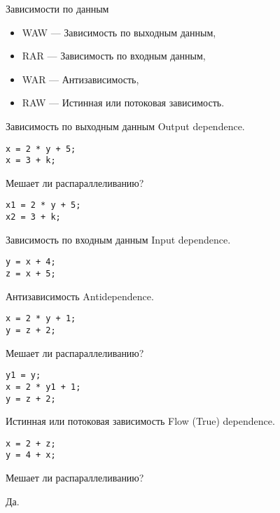 \begin{frame}{Зависимости по данным}
\begin{itemize}
  \item WAW --- Зависимость по выходным данным,
  \item RAR --- Зависимость по входным данным,
  \item WAR --- Антизависимость,
  \item RAW --- Истинная или потоковая зависимость.
\end{itemize}
\end{frame}

\begin{frame}[fragile]{Зависимость по выходным данным}
Output dependence.

\pause\bigskip

\begin{lstlisting}
x = 2 * y + 5;
x = 3 + k;
\end{lstlisting}

Мешает ли распараллеливанию?

\pause\bigskip

\begin{lstlisting}
x1 = 2 * y + 5;
x2 = 3 + k;
\end{lstlisting}
\end{frame}

\begin{frame}[fragile]{Зависимость по входным данным}
Input dependence.

\pause\bigskip

\begin{lstlisting}
y = x + 4;
z = x + 5;
\end{lstlisting}
\end{frame}

\begin{frame}[fragile]{Антизависимость}
Antidependence.

\pause\bigskip

\begin{lstlisting}
x = 2 * y + 1;
y = z + 2;
\end{lstlisting}

Мешает ли распараллеливанию?

\pause

\begin{lstlisting}
y1 = y;
x = 2 * y1 + 1;
y = z + 2;
\end{lstlisting}
\end{frame}

\begin{frame}[fragile]{Истинная или потоковая зависимость}
Flow (True) dependence.

\pause\bigskip

\begin{lstlisting}
x = 2 + z;
y = 4 + x;
\end{lstlisting}

\pause\bigskip

Мешает ли распараллеливанию?

\pause\bigskip

Да.
\end{frame}

